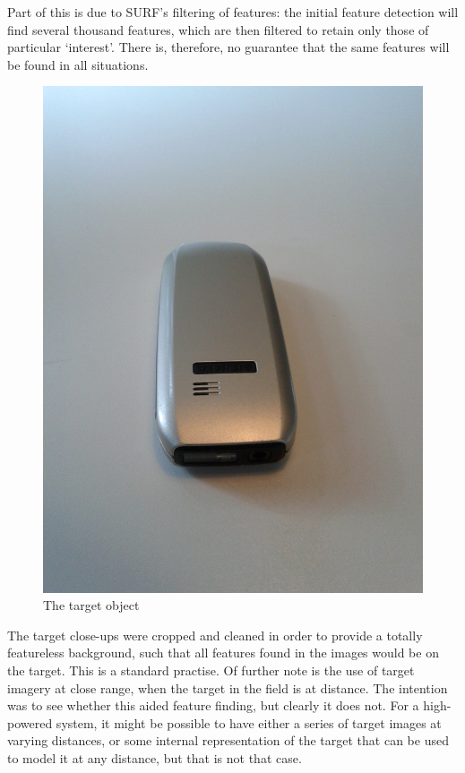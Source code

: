 Part of this is due to SURF’s filtering of features: the initial feature detection will find several thousand features, which are then filtered to retain only those of particular ‘interest’. There is, therefore, no guarantee that the same features will be found in all situations.\\

\begin{figure}
\begin{center}
    \includegraphics[scale=0.18]{images/20130207_134729.jpg}
    \caption{The target object}
\end{center}
\end{figure}

The target close-ups were cropped and cleaned in order to provide a totally featureless background, such that all features found in the images would be on the target. This is a standard practise. Of further note is the use of target imagery at close range, when the target in the field is at distance. The intention was to see whether this aided feature finding, but clearly it does not. For a high-powered system, it might be possible to have either a series of target images at varying distances, or some internal representation of the target that can be used to model it at any distance, but that is not that case.\\

